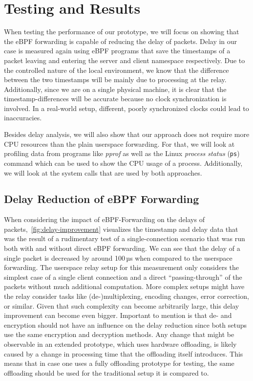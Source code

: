 \section{Testing and Results}\label{sec:testing_and_results}
When testing the performance of our prototype, we will focus on showing that the eBPF forwarding
is capable of reducing the delay of packets.
Delay in our case is measured again using eBPF programs that save the timestamps of a packet 
leaving and entering the server and client namespace respectively.
Due to the controlled nature of the local environment, we know that the difference 
between the two timestamps will be mainly due to processing at the relay.
Additionally, since we are on a single physical machine, it is clear that the timestamp-differences
will be accurate because no clock synchronization is involved.
In a real-world setup, different, poorly synchronized clocks could lead to inaccuracies.

Besides delay analysis, we will also show that our approach does not require more CPU resources than the plain userspace forwarding.
For that, we will look at profiling data from programs like \textit{pprof} %
as well as the Linux \textit{process status} (\verb|ps|) command which can be used to 
show the CPU usage of a process. %
Additionally, we will look at the system calls that are used by both approaches.

\subsection{Delay Reduction of eBPF Forwarding}
When considering the impact of eBPF-Forwarding on the delays of packets,~\autoref{fig:delay-improvement}
visualizes the timestamp and delay data that was the result of a rudimentary test of a single-connection 
scenario that was run both with and without direct eBPF forwarding.
We can see that the delay of a single packet is decreased by around 100\,µs
when compared to the userspace forwarding. 
The userspace relay setup for this measurement only considers the simplest case of a single client connection 
and a direct ``passing-through'' of the packets without much additional computation.
More complex setups might have the relay consider tasks like (de-)multiplexing, 
encoding changes, error correction, or similar. 
Given that such complexity can become arbitrarily large, this delay improvement can become even bigger.
Important to mention is that de- and encryption should not have an influence on the delay 
reduction since both setups use the same encryption and decryption methods.
Any change that might be observable in an extended prototype, which uses hardware offloading,
is likely caused by a change in processing time that the offloading itself introduces.
This means that in case one uses a fully offloading prototype for testing, the same offloading
should be used for the traditional setup it is compared to.

